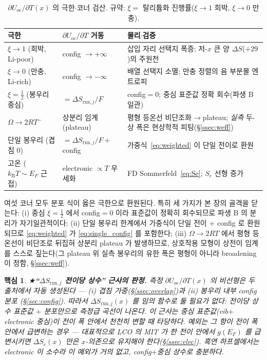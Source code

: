 \documentclass[11pt,a4paper]{article}
\newtheorem*{keybox}{핵심}
\newcommand{\rxn}{\mathrm{rxn}}
\newcommand{\oc}{\mathrm{oc}}
\newcommand{\kB}{k_{\mathrm B}}
\begin{document}
\begin{table}[t]
\centering\small
\renewcommand{\arraystretch}{1.35}
\caption{$\partial U_\oc/\partial T(x)$ 의 극한$\cdot$코너 검산. 규약: $\xi=$ 탈리튬화 진행률($\xi\to1$ 희박, $\xi\to0$ 만충).}
\label{tab:limits}
\begin{tabular}{l l l}
\toprule
극한 & $\partial U_\oc/\partial T$ 거동 & 물리$\cdot$검증 \\
\midrule
$\xi\to1$ (희박, Li-poor) & config $\to+\infty$ & 삽입 자리 선택지 폭증; 저-$x$ 큰 양 $\Delta S$($+29$)의 주원천 \\
$\xi\to0$ (만충, Li-rich) & config $\to-\infty$ & 배열 선택지 소멸; 만충 정렬의 음 부분몰 엔트로피 \\
$\xi=\tfrac12$ (봉우리 중심) & $=\Delta S_{\rxn,j}/F$ & config$=0$; 중심 표준값 정확 회수(파생 B 일관) \\
$\Omega\to2RT^-$ & 상분리 임계(plateau) & 평형 등온선 비단조화$\to$plateau; \emph{실측} 두-상 폭은 현상학적 피팅(\S\ref{ssec:weff}) \\
단일 봉우리 (겹침 0) & $=\Delta S_{\rxn,j}/F+$ config & 가중식~\eqref{eq:weighted} 이 단일 전이로 환원 \\
고온 ($\kB T\!\sim\!E_F$ 근접) & electronic $\propto T$ 우세화 & FD Sommerfeld~\eqref{eq:Se}; $S_e$ 선형 증가 \\
\bottomrule
\end{tabular}
\end{table}

여섯 코너 모두 분포 식이 옳은 극한으로 환원된다. 특히 세 가지가 본 장의 골격을 닫는다: (i) 중심
$\xi=\tfrac12$ 에서 config$=0$ 이라 표준값이 정확히 회수되므로 파생 B 의 분리가 자기일관적이다; (ii) 단일
봉우리 한계에서 가중식이 단일 전이 $+$ config 로 환원되므로 \eqref{eq:weighted} 가 \eqref{eq:single_config} 를
포함한다; (iii) $\Omega\to2RT$ 에서 평형 등온선이 비단조로 뒤집혀 상분리 plateau 가 발생하므로, 상호작용 모형이
상전이 임계를 스스로 짚는다(그 plateau 위 실측 봉우리의 유한 폭은 평형이 아니라 broadening 이 정함, \S\ref{ssec:weff}).

\begin{keybox}
★\textbf{``$\Delta S_{\rxn,j}$ 전이당 상수'' 근사의 판정.} 측정 $\partial U_\oc/\partial T(x)$ 의 비선형은 두
출처에서 \emph{자동 생성}된다 — (i) 겹침 가중(\S\ref{ssec:overlap})과 (ii) 봉우리 내부 config 분포
(\S\ref{sec:config}). 따라서 $\Delta S_{\rxn,j}(x)$ 를 임의 함수로 둘 필요가 \emph{없다}: 전이당 \emph{상수}
표준값 $+$ 분포만으로 측정급 곡선이 나온다. 이 근사는 \emph{중심 표준값(vib$+$electronic 중심)이 전이 폭 안에서
천천히 변할 때} 타당하다. 예외는 그 항이 전이 폭 \emph{안에서} 급변하는 경우 — 대표적으로 LCO 의 MIT 가 한
전이 안에서 $g(E_F)$ 를 급변시키면 $\Delta S_e(x)$ 만은 $x$-의존으로 유지해야 한다(\S\ref{ssec:elec}). 흑연
하프셀에서는 electronic 이 소수라 이 예외가 거의 없고, config$+$중심 상수로 충분하다.
\end{keybox}
\end{document}
